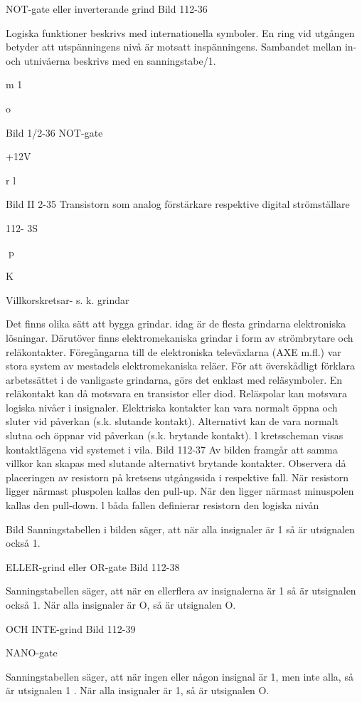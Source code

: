 \documentclass[a4paper,twoside,twocolumn,openright]{book}
\begin{document}
{{{{NOT-gate eller inverterande grind
Bild 112-36

Logiska funktioner beskrivs med internationella symboler. En ring vid utgången betyder att utspänningens nivå är motsatt inspänningens. Sambandet mellan in- och utnivåerna beskrivs med en sanningstabe/1.

m
1

o

Bild 1/2-36 NOT-gate

+12V

r
l

Bild II 2-35 Transistorn som analog förstärkare respektive digital strömställare

112- 3S

p

K

Villkorskretsar- s. k. grindar

Det finns olika sätt att bygga grindar. idag är
de flesta grindarna elektroniska lösningar.
Därutöver finns elektromekaniska grindar i
form av strömbrytare och reläkontakter.
Föregångarna till de elektroniska televäxlarna (AXE m.fl.) var stora system av
mestadels elektromekaniska reläer.
För att överskådligt förklara arbetssättet
i de vanligaste grindarna, görs det enklast
med reläsymboler. En reläkontakt kan då
motsvara en transistor eller diod. Reläspolar
kan motsvara logiska nivåer i insignaler.
Elektriska kontakter kan vara normalt
öppna och sluter vid påverkan (s.k. slutande
kontakt). Alternativt kan de vara normalt
slutna och öppnar vid påverkan (s.k. brytande kontakt). l kretsscheman visas kontaktlägena vid systemet i vila.
Bild 112-37
Av bilden framgår att samma villkor kan
skapas med slutande alternativt brytande
kontakter. Observera då placeringen av resistorn på kretsens utgångssida i respektive
fall. När resistorn ligger närmast pluspolen
kallas den pull-up. När den ligger närmast
minuspolen kallas den pull-down. l båda
fallen definierar resistorn den logiska nivån

Bild
Sanningstabellen i bilden säger, att när alla
insignaler är 1 så är utsignalen också 1.

ELLER-grind eller OR-gate
Bild 112-38

Sanningstabellen säger, att när en ellerflera
av insignalerna är 1 så är utsignalen också
1. När alla insignaler är O, så är utsignalen O.

OCH INTE-grind
Bild 112-39

NANO-gate

Sanningstabellen säger, att när ingen eller
någon insignal är 1, men inte alla, så är
utsignalen 1 . När alla insignaler är 1, så är
utsignalen O.

}}}}
\end{document}
